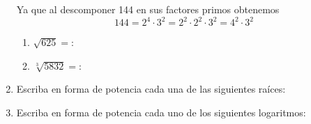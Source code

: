 \documentclass[twosides]{article}
\begin{document}
\begin{enumerate}
  Ya que al descomponer 144 en sus factores primos obtenemos\\
  \[ 144=2^4\cdot3^2=2^2\cdot2^2\cdot3^2=4^2\cdot3^2 \]
  \begin{enumerate}
    \item $ \sqrt{625}= $: \hrulefill
    \item $ \sqrt[3]{5832}= $: \hrulefill
  \end{enumerate}
    \item Escriba en forma de potencia cada una de las siguientes raíces:
    \begin{enumerate}
   \end{enumerate}
  \item Escriba en forma de potencia cada uno de los siguientes logaritmos:
  \begin{enumerate}
  \end{enumerate}
\end{enumerate}
\end{document}
